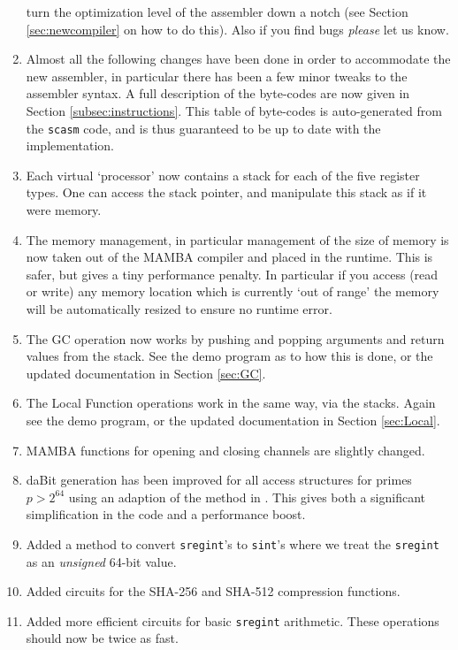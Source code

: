 \begin{enumerate}
  turn the optimization level of the assembler down a notch
  (see Section \ref{sec:newcompiler} on how to do this). 
  Also if you find bugs {\em please} let us know. 
  \item Almost all the following changes have been done in order
  to accommodate the new assembler, in particular there has been
  a few minor tweaks to the assembler syntax.
  A full description of the byte-codes are now
  given in Section \ref{subsec:instructions}. This table of 
  byte-codes is auto-generated
  from the \verb+scasm+ code, and is thus guaranteed to be up to date with the implementation.
  \item Each virtual `processor' now contains a stack for each
  of the five register types. One can access the stack pointer,
  and manipulate this stack as if it were memory.
  \item The memory management, in particular management of the
  size of memory is now taken out of the MAMBA compiler and
  placed in the runtime. This is safer, but gives a tiny
  performance penalty. In particular if you access (read or write)
  any memory location which is currently `out of range' the
  memory will be automatically resized to ensure no runtime
  error.
  \item The GC operation now works by pushing and popping
  arguments and return values from the stack. See the demo
  program as to how this is done, or the updated documentation
  in Section \ref{sec:GC}.
  \item The Local Function operations work in the same way, via
  the stacks. Again see the demo program, or the updated
  documentation in Section \ref{sec:Local}.
  \item MAMBA functions for opening and closing channels are slightly
  changed.
  \item daBit generation has been improved for all access structures
  for primes $p>2^{64}$ using an adaption of the method in \cite{SPDZKG}.
  This gives both a significant simplification in the code and
  a performance boost.
  \item Added a method to convert \verb|sregint|'s to \verb|sint|'s
  where we treat the \verb|sregint| as an {\em unsigned} 64-bit value.
  \item Added circuits for the SHA-256 and SHA-512 compression functions.
  \item Added more efficient circuits for basic \verb|sregint| arithmetic.
  These operations should now be twice as fast.
 \end{enumerate}

